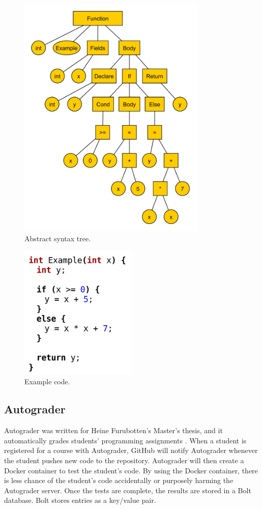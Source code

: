 \documentclass[10pt,journal,compsoc]{IEEEtran}
\begin{document}
			\begin{figure}
				\includegraphics[width=0.8\textwidth]{AST.pdf}
				\caption{Abstract syntax tree.}
				\label{fig:ast}
			\end{figure}
			\begin{figure}
				\includegraphics[width=0.5\textwidth]{ASTcode.png}
				\caption{Example code.}
				\label{fig:astcode}
			\end{figure}
		
		\subsection{Autograder}
		Autograder was written for Heine Furubotten's Master's thesis, and it automatically grades students' programming assignments \cite{furubotten}. When a student is registered for a course with Autograder, GitHub will notify Autograder whenever the student pushes new code to the repository. Autograder will then create a Docker container to test the student's code. By using the Docker container, there is less chance of the student's code accidentally or purposely harming the Autograder server. Once the tests are complete, the results are stored in a Bolt database. Bolt stores entries as a key/value pair.
		
\end{document}
